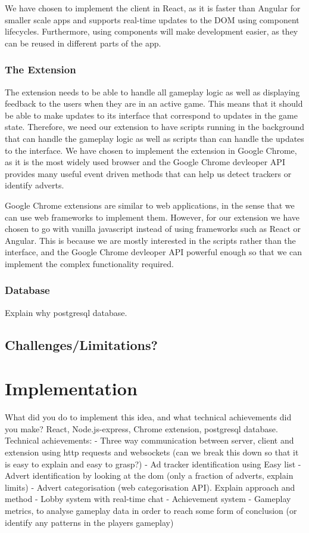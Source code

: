 \documentclass{l4proj}
\begin{document}
We have chosen to implement the client in React, as it is faster than Angular for smaller scale apps and supports real-time updates to the DOM using component lifecycles. Furthermore, using components will make development easier, as they
can be reused in different parts of the app.

\subsection{The Extension}
The extension needs to be able to handle all gameplay logic as well as displaying feedback to the users when they are in an active game. This means that it should be able to make updates to its interface that correspond to updates in the game state.
Therefore, we need our extension to have scripts running in the background that can handle the gameplay logic as well as scripts than can handle the updates to the interface. We have chosen to implement the extension in Google Chrome, as it is the
most widely used browser and the Google Chrome devleoper API provides many useful event driven methods that can help us detect trackers or identify adverts.

Google Chrome extensions are similar to web applications, in the sense that we can use web frameworks to implement them. However, for our extension we have chosen to go with vanilla javascript instead of using frameworks such as React or Angular.
This is because we are mostly interested in the scripts rather than the interface, and the Google Chrome devleoper API powerful enough so that we can implement the complex functionality required.

\subsection{Database}
Explain why postgresql database.

\section{Challenges/Limitations?}


\chapter{Implementation}
\label{implementation}
What did you do to implement this idea, and what technical achievements did you make? 
React, Node.js-express, Chrome extension, postgresql database. 
Technical achievements:
- Three way communication between server, client and extension using http requests and websockets (can we break this down so that it is easy to explain and easy to grasp?)
- Ad tracker identification using Easy list
- Advert identification by looking at the dom (only a fraction of adverts, explain limits)
- Advert categorisation (web categorisation API). Explain approach and method
- Lobby system with real-time chat
- Achievement system
- Gameplay metrics, to analyse gameplay data in order to reach some form of conclusion (or identify any patterns in the players gameplay)
\end{document}

